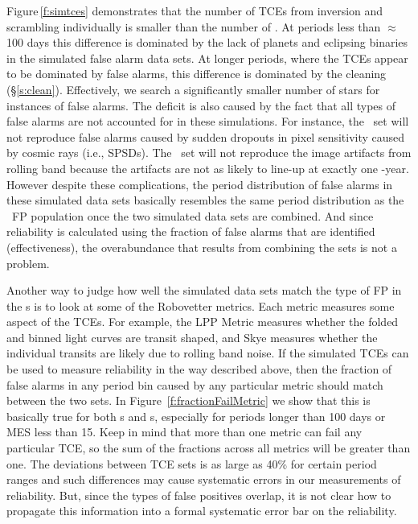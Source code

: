 Figure\,\ref{f:simtces} demonstrates that the number of TCEs from inversion and scrambling individually is smaller than the number of \opstces. At periods less than $\approx$100 days this difference is dominated by the lack of planets and eclipsing binaries in the simulated false alarm data sets.  At longer periods, where the TCEs appear to be dominated by false alarms, this difference is dominated by the cleaning (\S\ref{s:clean}). Effectively, we search a significantly smaller number of stars for instances of false alarms. The deficit is also caused by the fact that all types of false alarms are not accounted for in these simulations. For instance, the \invtce\ set will not reproduce false alarms caused by sudden dropouts in pixel sensitivity caused by cosmic rays (i.e., SPSDs). The \scrtce\ set will not reproduce the image artifacts from rolling band because the artifacts are not as likely to line-up at exactly one \Kepler -year.  However despite these complications, the period distribution of false alarms in these simulated data sets basically resembles the same period distribution as the \opstce\ FP population once the two simulated data sets are combined. And since reliability is calculated using the fraction of false alarms that are identified (effectiveness), the overabundance that results from combining the sets is not a problem.

Another way to judge how well the simulated data sets match the type of FP in the \opstce s is to look at some of the Robovetter metrics.  Each metric measures some aspect of the TCEs. For example, the LPP Metric measures whether the folded and binned light curves are transit shaped, and Skye measures whether the individual transits are likely due to rolling band noise.  If the simulated TCEs can be used to measure reliability in the way described above, then the fraction of false alarms in any period bin caused by any particular metric should match between the two sets.  In Figure~\ref{f:fractionFailMetric} we show that this is basically true for both \invtce s and \scrtce s, especially for periods longer than 100 days or MES less than 15.  Keep in mind that more than one metric can fail any particular TCE, so the sum of the fractions across all metrics will be greater than one.  The deviations between TCE sets is as large as 40\% for certain period ranges and such differences may cause systematic errors in our measurements of reliability.  But, since the types of false positives overlap, it is not clear how to propagate this information into a formal systematic error bar on the reliability.  

